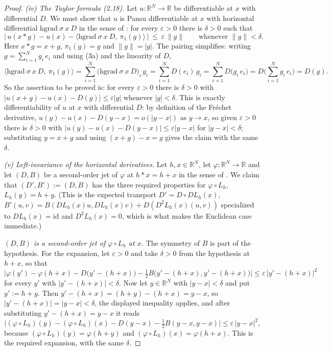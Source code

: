 \begin{proof}
\emph{(iv) The Taylor formula (2.18).} Let $u:\mathbb R^N\to\mathbb R$ be
differentiable at $x$ with differential $D$. We must show that $u$ is Pansu differentiable
at $x$ with horizontal differential $\mathrm{hgrad}\ \sigma\ x\ D$ in the sense of
: for every $\varepsilon>0$ there is $\delta>0$ such that
\[
 \Big|\,u(x*g)-u(x)-\big\langle \mathrm{hgrad}\ \sigma\ x\ D,\ \pi_1(g)\big\rangle\,\Big|
  \ \le\ \varepsilon\,\|g\|\qquad\text{whenever }\|g\|<\delta .
\]
Here $x*g=x+g$, $\pi_1(g)=g$ and $\|g\|=|g|$. The pairing simplifies: writing
$g=\sum_{i=1}^{N}g_i\,e_i$ and using (3a) and the linearity of $D$,
\[
 \big\langle \mathrm{hgrad}\ \sigma\ x\ D,\ \pi_1(g)\big\rangle
  =\sum_{i=1}^{N}\big(\mathrm{hgrad}\ \sigma\ x\ D\big)_i\,g_i
  =\sum_{i=1}^{N}D(e_i)\,g_i
  =\sum_{i=1}^{N}D\big(g_i\,e_i\big)
  =D\Big(\sum_{i=1}^{N}g_i\,e_i\Big)=D(g).
\]
So the assertion to be proved is: for every $\varepsilon>0$ there is $\delta>0$ with
$|u(x+g)-u(x)-D(g)|\le\varepsilon|g|$ whenever $|g|<\delta$. This is exactly
differentiability of $u$ at $x$ with differential $D$: by definition of the Fr\'echet
derivative, $u(y)-u(x)-D(y-x)=o(|y-x|)$ as $y\to x$, so given $\varepsilon>0$ there is
$\delta>0$ with $|u(y)-u(x)-D(y-x)|\le\varepsilon|y-x|$ for $|y-x|<\delta$; substituting
$y=x+g$ and using $(x+g)-x=g$ gives the claim with the same $\delta$.

\emph{(v) Left-invariance of the horizontal derivatives.} Let $h,x\in\mathbb R^N$, let
$\varphi:\mathbb R^N\to\mathbb R$ and let $(D,B)$ be a second-order jet of $\varphi$ at
$h*x=h+x$ in the sense of . We claim that $(D',B'):=(D,B)$ has the
three required properties for $\varphi\circ L_h$, $L_h(y)=h+y$. (This is the expected
transport $D'=D\circ DL_h(x)$, $B'(u,v)=B(DL_h(x)u,DL_h(x)v)+D(D^2L_h(x)(u,v))$ specialized
to $DL_h(x)=\mathrm{id}$ and $D^2L_h(x)=0$, which is what makes the Euclidean case
immediate.)

\quad\emph{$(D,B)$ is a second-order jet of $\varphi\circ L_h$ at $x$.} The symmetry of $B$
is part of the hypothesis. For the expansion, let $\varepsilon>0$ and take $\delta>0$ from
the hypothesis at $h+x$, so that
\[
 \Big|\varphi(y')-\varphi(h+x)-D\big(y'-(h+x)\big)
   -\tfrac12B\big(y'-(h+x),y'-(h+x)\big)\Big|\le\varepsilon\,\big|y'-(h+x)\big|^{2}
\]
for every $y'$ with $|y'-(h+x)|<\delta$. Now let $y\in\mathbb R^N$ with $|y-x|<\delta$ and
put $y':=h+y$. Then $y'-(h+x)=(h+y)-(h+x)=y-x$, so $|y'-(h+x)|=|y-x|<\delta$, the displayed
inequality applies, and after substituting $y'-(h+x)=y-x$ it reads
\[
 \Big|(\varphi\circ L_h)(y)-(\varphi\circ L_h)(x)-D(y-x)-\tfrac12B(y-x,y-x)\Big|
   \le\varepsilon\,|y-x|^{2},
\]
because $(\varphi\circ L_h)(y)=\varphi(h+y)$ and $(\varphi\circ L_h)(x)=\varphi(h+x)$. This
is the required expansion, with the same $\delta$.


\end{proof}
